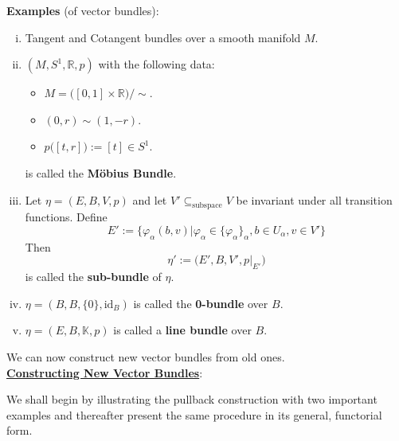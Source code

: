 \documentclass[11pt,a4paper]{article}
\begin{document}
\textbf{Examples} (of vector bundles):
\begin{enumerate}[(i)]
    \item Tangent and Cotangent bundles over a smooth manifold $M$.
    \item $(M, S^1, \mathbb{R}, p)$ with the following data:
    \begin{itemize}
        \item $M = \big([0,1]\times\mathbb{R}\big)/\sim$.
        \item $(0, r) \sim (1, -r)$.
        \item $p\big([t, r]\big) := [t]\in S^1$.
    \end{itemize}
    is called the \textbf{M\"obius Bundle}.
    \item Let $\eta = (E, B, V, p)$ and let $V' \subseteq_{\text{subspace}} V$ be invariant under all transition functions. Define
    $$E':= \big\{\varphi_{\alpha}(b,v) |  \varphi_{\alpha} \in \{\varphi_{\alpha}\}_{\alpha}, b\in U_{\alpha}, v\in V'\big\}$$
    Then $$\eta' := \big(E', B, V', p\big|_{E'}\big)$$ is called the \textbf{sub-bundle} of $\eta$.
    \item $\eta = (B, B, \{0\}, \text{id}_B)$ is called the \textbf{0-bundle} over $B$.
    \item $\eta = (E, B, \mathbb{K}, p)$ is called a \textbf{line bundle} over $B$.
\end{enumerate}


We can now construct new vector bundles from old ones.\\


\underline{\textbf{Constructing New Vector Bundles}}:

We shall begin by illustrating the pullback construction with two important examples and thereafter present the same procedure in its general, functorial form.
\end{document}
